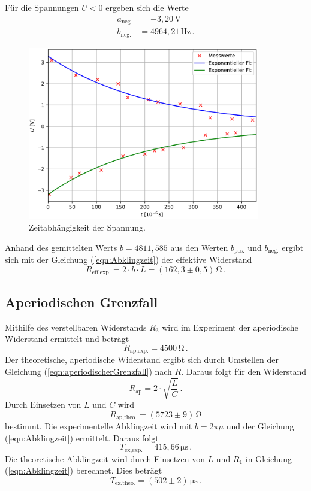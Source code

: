 Für die Spannungen $U < 0$ ergeben sich die Werte
\begin{align*}
  a_{\text{neg.}} &= -3,20\,\unit{\volt}\\
  b_{\text{neg.}} &= 4964,21\,\unit{\hertz}\,.
\end{align*}
\begin{figure}[H]
  \centering
  \includegraphics[width=0.90\textwidth]{plot_a.pdf}
  \caption{Zeitabhängigkeit der Spannung.}
  \label{fig:gedämpfteSchwingung}
\end{figure}
Anhand des gemittelten Werts $b = 4811,585$ aus den Werten $b_{\text{pos.}}$ und $b_{\text{neg.}}$ ergibt sich mit der Gleichung (\ref{eqn:Abklingzeit})
der effektive Widerstand 
$$R_{\text{eff,exp.}} = 2\cdot b\cdot L = \left(162,3\pm0,5\right)\,\unit{\ohm}\,.$$
%
%
%
\subsection{Aperiodischen Grenzfall}
Mithilfe des verstellbaren Widerstands $R_3$ wird im Experiment der aperiodische Widerstand ermittelt und beträgt
$$R_{\text{ap,exp.}} = 4500\,\unit{\ohm}\,.$$
Der theoretische, aperiodische Widerstand ergibt sich durch Umstellen der Gleichung (\ref{eqn:aperiodischerGrenzfall}) nach $R$. Daraus folgt für 
den Widerstand
$$R_\text{ap}= 2\cdot \sqrt{\frac{L}{C}}\,.$$
Durch Einsetzen von $L$ und $C$ wird
$$R_{\text{ap,theo.}} = (5723\pm9)\,\unit{\ohm}$$ bestimmt.
Die experimentelle Abklingzeit wird mit $b = 2 \pi \mu$ und der Gleichung (\ref{eqn:Abklingzeit}) ermittelt. Daraus folgt
$$T_{\text{ex,exp.}}= 415,66\,\unit{\micro\second}\,.$$
Die theoretische Abklingzeit wird durch Einsetzen von $L$ und $R_1$ in Gleichung (\ref{eqn:Abklingzeit}) berechnet. Dies beträgt
$$T_{\text{ex,theo.}}= \left(502\pm2\right)\,\unit{\micro\second}\,.$$
%
%
%
